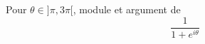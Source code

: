  Pour $\theta \in ]\pi,3\pi[$, module et argument de 
\[\frac{1}{1+e^{i\theta}}\]\bigskip \bigskip \bigskip 